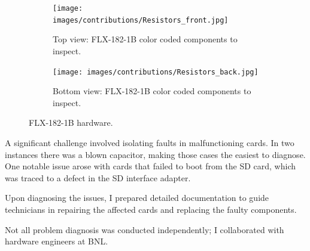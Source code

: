 \begin{figure}[H]
\centering
\begin{subfigure}[b]{\textwidth}
    \centering
    \texttt{[image: images/contributions/Resistors\_front.jpg]}
    \caption{Top view: FLX-182-1B color coded components to inspect.}
    \label{fig:FLX-182-top-resistors}
\end{subfigure}

\vspace{0.2cm}

\begin{subfigure}[b]{\textwidth}
    \centering
    \texttt{[image: images/contributions/Resistors\_back.jpg]}
    \caption{Bottom view: FLX-182-1B color coded components to inspect.}
    \label{fig:FLX-182-bot-resistors}
\end{subfigure}
\caption{FLX-182-1B hardware.}
\label{fig:FLX-182-hardware-inspection}
\end{figure}

A significant challenge involved isolating faults in malfunctioning cards. In two instances there was a blown capacitor, making those cases the easiest to diagnose. One notable issue arose with cards that failed to boot from the SD card, which was traced to a defect in the SD interface adapter.

Upon diagnosing the issues, I prepared detailed documentation to guide technicians in repairing the affected cards and replacing the faulty components.

Not all problem diagnosis was conducted independently; I collaborated with hardware engineers at \acf{BNL}.
